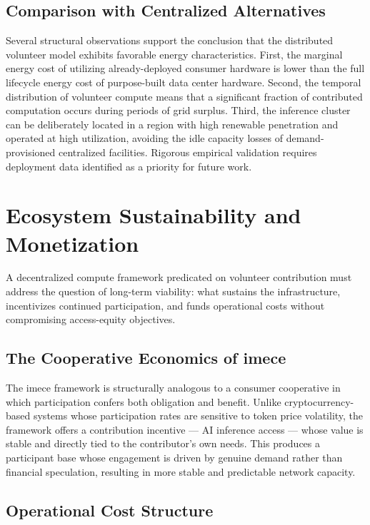 \documentclass[12pt]{article}
\begin{document}
\subsection{Comparison with Centralized Alternatives}

Several structural observations support the conclusion that the distributed volunteer model exhibits favorable energy characteristics. First, the marginal energy cost of utilizing already-deployed consumer hardware is lower than the full lifecycle energy cost of purpose-built data center hardware. Second, the temporal distribution of volunteer compute means that a significant fraction of contributed computation occurs during periods of grid surplus. Third, the inference cluster can be deliberately located in a region with high renewable penetration and operated at high utilization, avoiding the idle capacity losses of demand-provisioned centralized facilities. Rigorous empirical validation requires deployment data identified as a priority for future work.

\section{Ecosystem Sustainability and Monetization}
\label{sec:sustainability}

A decentralized compute framework predicated on volunteer contribution must address the question of long-term viability: what sustains the infrastructure, incentivizes continued participation, and funds operational costs without compromising access-equity objectives.

\subsection{The Cooperative Economics of imece}

The imece framework is structurally analogous to a consumer cooperative in which participation confers both obligation and benefit. Unlike cryptocurrency-based systems whose participation rates are sensitive to token price volatility, the framework offers a contribution incentive — AI inference access — whose value is stable and directly tied to the contributor's own needs. This produces a participant base whose engagement is driven by genuine demand rather than financial speculation, resulting in more stable and predictable network capacity.

\subsection{Operational Cost Structure}
\end{document}
